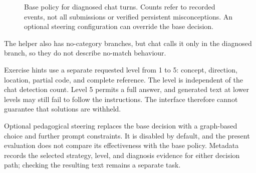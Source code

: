 \begin{figure}[htbp]
\centering
{}
\caption{Base policy for diagnosed chat turns. Counts refer to recorded events, not all submissions or verified persistent misconceptions. An optional steering configuration can override the base decision.}
\label{fig:teaching}
\end{figure}

The helper also has no-category branches, but chat calls it only in the diagnosed branch, so they do not describe no-match behaviour.

Exercise hints use a separate requested level from 1 to 5: concept, direction, location, partial code, and complete reference. The level is independent of the chat detection count. Level 5 permits a full answer, and generated text at lower levels may still fail to follow the instructions. The interface therefore cannot guarantee that solutions are withheld.

Optional pedagogical steering replaces the base decision with a graph-based choice and further prompt constraints. It is disabled by default, and the present evaluation does not compare its effectiveness with the base policy. Metadata records the selected strategy, level, and diagnosis evidence for either decision path; checking the resulting text remains a separate task.

